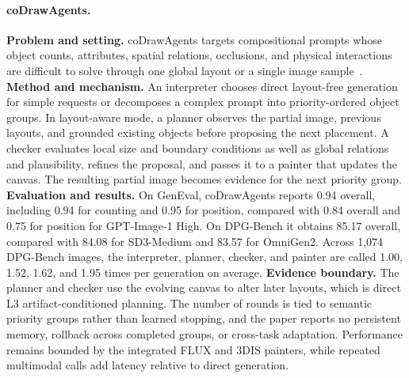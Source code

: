 \paragraph{coDrawAgents.}
\textbf{Problem and setting.} coDrawAgents targets compositional prompts whose object counts, attributes, spatial relations, occlusions, and physical interactions are difficult to solve through one global layout or a single image sample~\cite{avg260312829}. \textbf{Method and mechanism.} An interpreter chooses direct layout-free generation for simple requests or decomposes a complex prompt into priority-ordered object groups. In layout-aware mode, a planner observes the partial image, previous layouts, and grounded existing objects before proposing the next placement. A checker evaluates local size and boundary conditions as well as global relations and plausibility, refines the proposal, and passes it to a painter that updates the canvas. The resulting partial image becomes evidence for the next priority group. \textbf{Evaluation and results.} On GenEval, coDrawAgents reports 0.94 overall, including 0.94 for counting and 0.95 for position, compared with 0.84 overall and 0.75 for position for GPT-Image-1 High. On DPG-Bench it obtains 85.17 overall, compared with 84.08 for SD3-Medium and 83.57 for OmniGen2. Across 1,074 DPG-Bench images, the interpreter, planner, checker, and painter are called 1.00, 1.52, 1.62, and 1.95 times per generation on average. \textbf{Evidence boundary.} The planner and checker use the evolving canvas to alter later layouts, which is direct L3 artifact-conditioned planning. The number of rounds is tied to semantic priority groups rather than learned stopping, and the paper reports no persistent memory, rollback across completed groups, or cross-task adaptation. Performance remains bounded by the integrated FLUX and 3DIS painters, while repeated multimodal calls add latency relative to direct generation.

